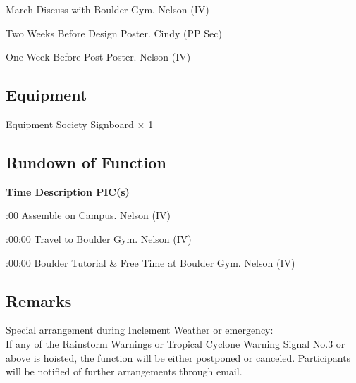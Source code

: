 \bTR{}
\eTD{} March
\eTD\bTD Discuss with Boulder Gym.
\eTD\bTD Nelson (IV)
\eTD\eTR

\bTR{}
\eTD\bTD Two Weeks Before
\eTD\bTD Design Poster.
\eTD\bTD Cindy (PP Sec)
\eTD\eTR

\bTR{}
\eTD\bTD One Week Before
\eTD\bTD Post Poster.
\eTD\bTD Nelson (IV)
\eTD\eTR

\eTABLEbody
\eTABLE

\pagebreak
\subsection{Equipment}
\starttabulate[|l|l|]
\NC{}Equipment\NC\NR
\HL
\NC Society Signboard   \NC $\times$ 1  \NR
\HL
\stoptabulate

\subsection{Rundown of Function}

\setupTABLE[c][1][width=1.25in]
\setupTABLE[c][2][width=3.5in]
\setupTABLE[c][3][width=1.25in]
\bTABLE
\bTABLEhead

\bTR\bTH    \bf{Time}
\eTH\bTH    \bf{Description}
\eTH\bTH    \bf{PIC(s)}
\eTH\eTR

\eTABLEhead
\bTABLEbody

\bTR{}:00
\eTD\bTD Assemble on Campus.
\eTD\bTD Nelson (IV)
\eTD\eTR

\bTR{}:00:00
\eTD\bTD Travel to Boulder Gym.
\eTD\bTD Nelson (IV)
\eTD\eTR

\bTR{}:00:00
\eTD\bTD Boulder Tutorial \& Free Time at Boulder Gym.
\eTD\bTD Nelson (IV)
\eTD\eTR

\eTABLEbody
\eTABLE

\subsection{Remarks}
\startitemize
\item Special arrangement during Inclement Weather or emergency: \\
If any of the Rainstorm Warnings or Tropical Cyclone Warning Signal No.3 or above is hoisted, the function will be either postponed or canceled. Participants will be notified of further arrangements through email.
\stopitemize

\stopsection
\pagebreak
